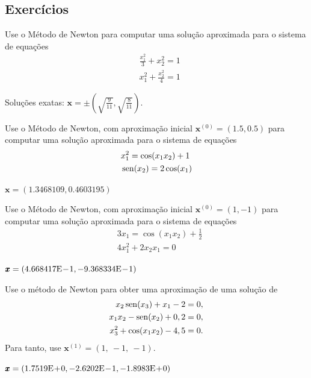 \subsection{Exercícios}

\begin{exer}
  Use o Método de Newton para computar uma solução aproximada para o sistema de equações
  \begin{subequations}
    \begin{align}
      & \frac{x_1^2}{3} + x_2^2 = 1\\
      & x_1^2 + \frac{x_2^2}{4} = 1
    \end{align}
  \end{subequations}
\end{exer}
\begin{resp}
  Soluções exatas: $\pmb{x} = \pm\left(\sqrt{\frac{9}{11}}, \sqrt{\frac{8}{11}}\right)$.
\end{resp}

\begin{exer}
  Use o Método de Newton, com aproximação inicial $\pmb{x}^{(0)} = (1.5, 0.5)$ para computar uma solução aproximada para o sistema de equações
  \begin{subequations}
    \begin{align}
      & x_1^2 = \cos(x_1x_2) + 1\\
      & \operatorname{sen}(x_2) = 2\cos(x_1)
    \end{align}
  \end{subequations}
\end{exer}
\begin{resp}
  $\pmb{x} = (1.3468109, 0.4603195)$
\end{resp}

\begin{exer}
  Use o Método de Newton, com aproximação inicial $\pmb{x}^{(0)} = (1, -1)$ para computar uma solução aproximada para o sistema de equações
  \begin{subequations}
    \begin{align}
      & 3x_1 = \cos(x_1x_2) + \frac{1}{2}\\
      & 4x_1^2 + 2x_2x_1 = 0
    \end{align}
  \end{subequations}  
\end{exer}
\begin{resp}
  $\pmb{x} = (4.668417\mathrm{E}\!-\!1, -9.368334\mathrm{E}\!-\!1)$
\end{resp}

\begin{exer}
  Use o método de Newton para obter uma aproximação de uma solução de
  \begin{align}
    x_2\operatorname{sen}(x_3)+x_1-2&=0,\\
    x_1x_2-\operatorname{sen}(x_2)+0,2&=0,\\
    x_3^2+\cos(x_1x_2)-4,5&=0.
  \end{align}
Para tanto, use $\pmb{x}^{(1)} = (1,~-1,~-1)$.
\end{exer}
\begin{resp}
  $\pmb{x} = (1.7519\mathrm{E}\!+\!0, -2.6202\mathrm{E}\!-\!1, -1.8983\mathrm{E}\!+\!0)$
\end{resp}

